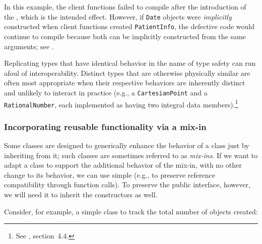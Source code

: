 \noindent 
In this example, the client functions failed to compile after the introduction of the , which is the intended effect. However, if \lstinline!Date! objects were \emph{implicitly} constructed when client functions created \lstinline!PatientInfo!, the defective code would continue to compile because both  can be implicitly constructed from the same arguments; see .

Replicating
types that have identical behavior in the name of type safety can run
afoul of interoperability. Distinct types that are otherwise
physically similar are often most appropriate when their respective
behaviors are inherently distinct and unlikely to interact in practice
(e.g., a \mbox{\lstinline!CartesianPoint!} and a \mbox{\lstinline!RationalNumber!},
each implemented as having two integral data members).\footnote{See
  \cite{lakos2a}, section~4.4.}

\subsubsection[Incorporating reusable functionality via a mix-in]{Incorporating reusable functionality via a mix-in}\label{incorporating-reusable-functionality-via-a-mix-in-class}

Some classes are designed to generically enhance the behavior of a class
just by inheriting from it; such classes are sometimes referred to as
\emph{mix-ins}. If we want to adapt a class to support the additional
behavior of the mix-in, with no other change to its behavior, we can use
simple  (e.g., to preserve reference
compatibility through function calls). To preserve the public interface,
however, we will need it to inherit the constructors as well.

Consider, for example, a simple class to track the total number of
objects created:


